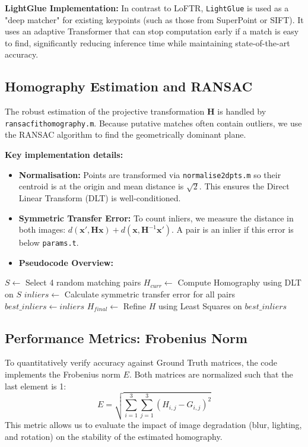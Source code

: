 \documentclass{article}
\begin{document}
\textbf{LightGlue Implementation:}
In contrast to LoFTR, \texttt{LightGlue} is used as a "deep matcher" for existing keypoints (such as those from SuperPoint or SIFT). It uses an adaptive Transformer that can stop computation early if a match is easy to find, significantly reducing inference time while maintaining state-of-the-art accuracy.

\subsection{Homography Estimation and RANSAC}
The robust estimation of the projective transformation $\mathbf{H}$ is handled by \texttt{ransacfithomography.m}. Because putative matches often contain outliers, we use the RANSAC algorithm to find the geometrically dominant plane.

\textbf{Key implementation details:}
\begin{itemize}
    \item \textbf{Normalisation:} Points are transformed via \texttt{normalise2dpts.m} so their centroid is at the origin and mean distance is $\sqrt{2}$. This ensures the Direct Linear Transform (DLT) is well-conditioned.
    \item \textbf{Symmetric Transfer Error:} To count inliers, we measure the distance in both images: $d(\mathbf{x}', \mathbf{H}\mathbf{x}) + d(\mathbf{x}, \mathbf{H}^{-1}\mathbf{x}')$. A pair is an inlier if this error is below \texttt{params.t}.
    \item \textbf{Pseudocode Overview:}
\end{itemize}

\begin{algorithm}
\caption{RANSAC for Homography Estimation}
\label{alg:ransac}
\begin{algorithmic}[1] %
    \STATE $S \leftarrow$ Select 4 random matching pairs
    \STATE $H_{curr} \leftarrow$ Compute Homography using DLT on $S$
    \STATE $inliers \leftarrow$ Calculate symmetric transfer error for all pairs
        \STATE $best\_inliers \leftarrow inliers$
    \ENDIF
\ENDFOR
\STATE $H_{final} \leftarrow$ Refine $H$ using Least Squares on $best\_inliers$
\end{algorithmic}
\end{algorithm}

\subsection{Performance Metrics: Frobenius Norm}
To quantitatively verify accuracy against Ground Truth matrices, the code implements the Frobenius norm $E$. Both matrices are normalized such that the last element is 1:
\begin{equation}
E = \sqrt{\sum_{i=1}^3 \sum_{j=1}^3 (H_{i,j} - G_{i,j})^2}
\end{equation}
This metric allows us to evaluate the impact of image degradation (blur, lighting, and rotation) on the stability of the estimated homography.
\end{document}
